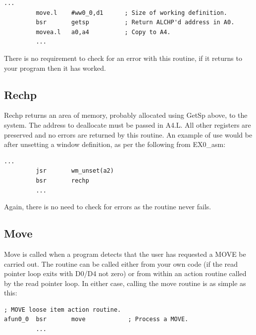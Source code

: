 \begin{lstlisting}[firstnumber=1,caption={EasyPEasy - GetSP Example},label={lst:EasyPeasyGetSPExample}]
         ...
         move.l    #ww0_0,d1      ; Size of working definition.
         bsr       getsp          ; Return ALCHP'd address in A0.
         movea.l   a0,a4          ; Copy to A4.
         ...
\end{lstlisting}

There is no requirement to check for an error with this routine, if it
            returns to your program then it has worked.

\subsection{Rechp}
\label{ch26-sub-rechp}%

Rechp returns an area of memory, probably allocated using GetSp above,
            to the system. The address to deallocate must be passed in A4.L. All other
            registers are preserved and no errors are returned by this routine. An example
            of use would be after unsetting a window definition, as per the following from
 EX0\_asm:

\begin{lstlisting}[firstnumber=1,caption={EasyPEasy - Rechp Example},label={lst:EasyPeasyRechpExample}]
         ...
         jsr       wm_unset(a2)
         bsr       rechp
         ...
\end{lstlisting}

Again, there is no need to check for errors as the routine never
            fails.

\subsection{Move}
\label{ch26-sub-move}%

Move is called when a program detects that the user has requested a MOVE
            be carried out. The routine can be called either from your own code (if the
            read pointer loop exits with D0/D4 not zero) or from within an action routine
            called by the read pointer loop. In either case, calling the move routine is
            as simple as this:

\begin{lstlisting}[firstnumber=1,caption={EasyPEasy - Move Example},label={lst:EasyPeasyMoveExample}]
; MOVE loose item action routine.         
afun0_0  bsr       move            ; Process a MOVE.
         ...
\end{lstlisting}

